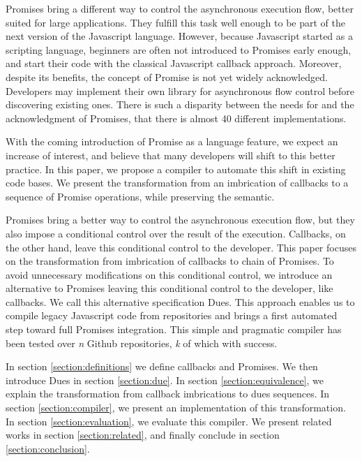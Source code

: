 Promises bring a different way to control the asynchronous execution flow, better suited for large applications.
They fulfill this task well enough to be part of the next version of the Javascript language.
However, because Javascript started as a scripting language, beginners are often not introduced to Promises early enough, and start their code with the classical Javascript callback approach.
Moreover, despite its benefits, the concept of Promise is not yet widely acknowledged.
Developers may implement their own library for asynchronous flow control before discovering existing ones.%
There is such a disparity between the needs for and the acknowledgment of Promises, that there is almost 40 different implementations.

With the coming introduction of Promise as a language feature, we expect an increase of interest, and believe that many developers will shift to this better practice.
In this paper, we propose a compiler to automate this shift in existing code bases.
We present the transformation from an imbrication of callbacks to a sequence of Promise operations, while preserving the semantic.

Promises bring a better way to control the asynchronous execution flow, but they also impose a conditional control over the result of the execution.
Callbacks, on the other hand, leave this conditional control to the developer.
This paper focuses on the transformation from imbrication of callbacks to chain of Promises.
To avoid unnecessary modifications on this conditional control, we introduce an alternative to Promises leaving this conditional control to the developer, like callbacks.
We call this alternative specification Dues.
This approach enables us to compile legacy Javascript code from repositories and brings a first automated step toward full Promises integration.
This simple and pragmatic compiler has been tested over \textit{n} Github repositories, \textit{k} of which with success. 

In section \ref{section:definitions} we define callbacks and Promises.
We then introduce Dues in section \ref{section:due}.
In section \ref{section:equivalence}, we explain the transformation from callback imbrications to dues sequences.
In section \ref{section:compiler}, we present an implementation of this transformation.
In section \ref{section:evaluation}, we evaluate this compiler.
We present related works in section \ref{section:related}, and finally conclude in section \ref{section:conclusion}.